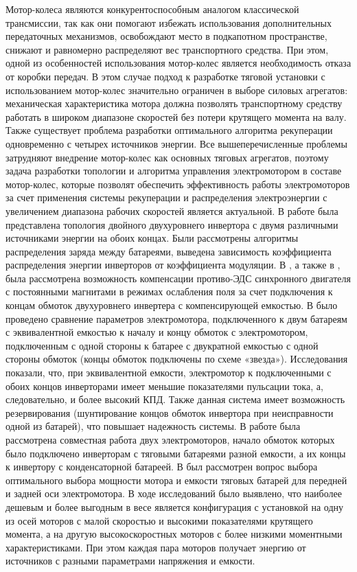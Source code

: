 
{\actuality} 
Мотор-колеса являются конкурентоспособным аналогом классической трансмиссии, так как они помогают избежать использования дополнительных передаточных механизмов, освобождают место в подкапотном пространстве, снижают и равномерно распределяют вес транспортного средства. 
При этом, одной из особенностей использования мотор-колес является необходимость отказа от коробки передач. В этом случае подход к разработке тяговой установки с использованием мотор-колес значительно ограничен в выборе силовых агрегатов: механическая характеристика мотора должна позволять транспортному средству работать в широком диапазоне скоростей без потери крутящего момента на валу. Также существует проблема разработки оптимального алгоритма рекуперации одновременно с четырех источников энергии. Все вышеперечисленные проблемы затрудняют внедрение мотор-колес как основных тяговых агрегатов, поэтому задача разработки топологии и алгоритма управления электромотором в составе мотор-колес, которые позволят обеспечить эффективность работы электромоторов за счет применения системы рекуперации и распределения электроэнергии с увеличением диапазона рабочих скоростей является актуальной.
В работе  была представлена топология двойного двухуровнего инвертора с двумя различными источниками энергии на обоих концах. Были рассмотрены алгоритмы распределения заряда между батареями, выведена зависимость коэффициента распределения энергии инверторов от коэффициента модуляции. В \cite{Sun}, а также в \cite{leey}, была рассмотрена возможность компенсации противо-ЭДС  синхронного двигателя с постоянными магнитами  в режимах ослабления поля за счет подключения к концам обмоток двухуровнего инвертера с компенсирующей емкостью. В \cite{Loncarski} было проведено сравнение параметров электромотора, подключенного к двум батареям с эквивалентной емкостью к началу и концу обмоток с электромотором, подключенным с одной стороны к батарее с двукратной емкостью с одной стороны обмоток (концы обмоток подключены по схеме «звезда»). Исследования показали, что, при эквивалентной емкости, электромотор к подключенными с обоих концов инверторами имеет меньшие показателями пульсации тока, а, следовательно, и более высокий КПД. Также данная система имеет возможность резервирования (шунтирование концов обмоток инвертора при неисправности одной из батарей), что повышает надежность системы. В работе \cite{Attaianese} была  рассмотрена совместная работа двух электромоторов, начало обмоток которых было подключено инверторам с тяговыми батареями разной емкости, а их концы к инвертору с конденсаторной батареей. В \cite{Cordopatri} был рассмотрен вопрос выбора оптимального выбора мощности мотора и емкости тяговых батарей для передней и задней оси электромотора. В ходе исследований было выявлено, что наиболее дешевым и более выгодным в весе является конфигурация с установкой на одну из осей моторов с малой скоростью и высокими показателями крутящего момента, а на другую высокоскоростных моторов с более низкими моментными характеристиками. При этом каждая пара моторов получает энергию от источников с разными параметрами напряжения и емкости.
